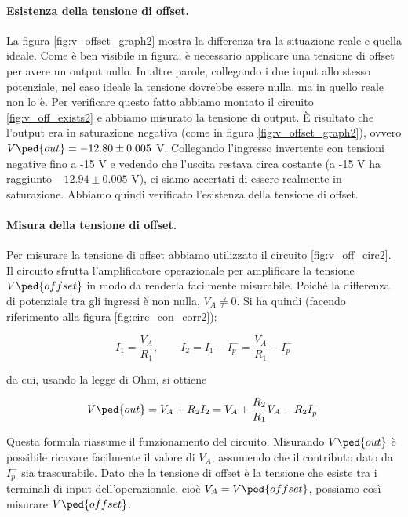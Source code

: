 \paragraph{Esistenza della tensione di offset.}

La figura \ref{fig:v_offset_graph2} mostra la differenza tra la situazione reale e quella
ideale. Come è ben visibile in figura, è necessario applicare una tensione di offset per
avere un output nullo. In altre parole, collegando i due input allo stesso potenziale,
nel caso ideale la tensione dovrebbe essere nulla, ma in quello reale non lo è.
Per verificare questo fatto abbiamo montato il circuito \ref{fig:v_off_exists2} e abbiamo misurato
la tensione di output. È risultato che l'output era in saturazione negativa (come in figura \ref{fig:v_offset_graph2}),
ovvero $V\ped{out} = -12.80 \pm 0.005$ V. Collegando l'ingresso invertente con tensioni negative fino a -15 V
e vedendo che l'uscita restava circa costante (a -15 V ha raggiunto $-12.94 \pm 0.005$ V),
ci siamo accertati di essere realmente in saturazione. Abbiamo quindi verificato l'esistenza
della tensione di offset.

\paragraph{Misura della tensione di offset.}

Per misurare la tensione di offset abbiamo utilizzato il circuito \ref{fig:v_off_circ2}.
Il circuito sfrutta l'amplificatore operazionale per amplificare la tensione $V\ped{offset}$
in modo da renderla facilmente misurabile.
Poiché la differenza di potenziale tra gli ingressi è non nulla, 
$V_A \neq 0$. Si ha quindi (facendo riferimento alla figura \ref{fig:circ_con_corr2}):

\begin{equation}
    I_1  = \frac{V_A}{R_1}, \qquad I_2 = I_1 - I_p^- = \frac{V_A}{R_1} - I_p^-
\end{equation}

da cui, usando la legge di Ohm, si ottiene

\begin{equation}
    V\ped{out} = V_A + R_2 I_2 = V_A + \frac{R_2}{R_1} V_A - R_2 I_p^-
    \label{eq:law2}
\end{equation}

Questa formula riassume il funzionamento del circuito. Misurando $V\ped{out}$ è possibile
ricavare facilmente il valore di $V_A$, assumendo che il contributo dato da $I_p^-$ sia trascurabile.
Dato che la tensione di offset è la tensione che esiste tra i terminali
di input dell'operazionale, cioè $V_A = V\ped{offset}$, possiamo così misurare $V\ped{offset}$.

